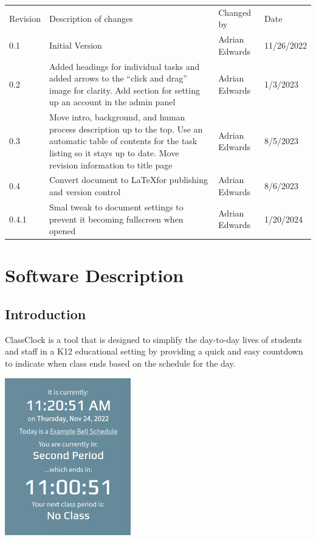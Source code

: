 \documentclass{article}
\begin{document}
\bigskip
\normalsize
{
	\centering
	\begin{tabularx}{\textwidth}{m{3.5em} X m{7.2em} m{1em}}
	{Revision} &
	{Description of changes} &
	{Changed by} &
	{Date}\\

	{0.1} &
	{Initial Version} &
	{Adrian Edwards} &
	{11/26/2022}\\

	{0.2} &
	{Added headings for individual tasks and added arrows to the “click and drag” image for
	clarity. Add section for setting up an account in the admin panel} &
	{Adrian Edwards} &
	{1/3/2023}\\

	{0.3} &
	{Move intro, background, and human process description up to the top. Use an automatic table of
	contents for the task listing so it stays up to date. Move revision information to title page} &
	{Adrian Edwards} &
	{8/5/2023}\\

	{0.4} &
	{Convert document to \LaTeX for publishing and version control} &
	{Adrian Edwards} &
	{8/6/2023}\\

	{0.4.1} &
	{Smal tweak to document settings to prevent it becoming fullscreen when opened} &
	{Adrian Edwards} &
	{1/20/2024}\\
	
\end{tabularx}\par
}

\bigskip

\dosecttoc
\tableofcontents
\newpage

\section{Software Description}
\subsection{Introduction}
{ClassClock is a tool that is designed to simplify the day-to-day lives of students and staff in a K12 educational
setting by providing a quick and easy countdown to indicate when class ends based on the schedule for the day.}

\begin{center}
\includegraphics[width=2.1575in,height=2.6972in]{images/classclock-schedule-updated.png}
\end{center}
\end{document}
